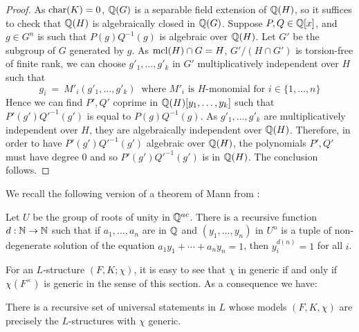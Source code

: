\begin{proof}
As $\mathrm{char}(K)=0$, $\mathbb{Q}(G)$ is a separable field extension of $\mathbb{Q}(H)$, so it suffices to check that $\mathbb{Q}(H)$ is algebraically closed in $\mathbb{Q}(G)$. 
Suppose $P, Q \in \mathbb{Q}[x]$, and $g \in G^n$ is such that $P(g)Q^{-1}(g)$ is algebraic over $\mathbb{Q}(H)$. Let $G'$ be the subgroup of $G$ generated by $g$. 
As $\mathrm{mcl}(H) \cap G=H $, $G'\slash (H \cap G')$ is torsion-free of finite rank, we can choose $g'_1, \ldots, g'_k$ in $G'$ multiplicatively independent over $H$ such that $$g_i\ =\ M'_i(g'_1, \ldots, g'_k)\ \text{ where }  M'_i \text{ is } H\text{-monomial for }i \in \{1, \ldots, n\}$$
Hence we can find  $P', Q'$ coprime in $\mathbb{Q}(H)[y_1, \ldots, y_k]$ such that $P'(g')Q'^{-1}(g')$ is equal to  $P(g)Q^{-1}(g)$.
As $g'_1, \ldots, g'_k$ are multiplicatively independent over $H$, they are algebraically independent over $\mathbb{Q}(H)$. 
Therefore, in order to have $P'(g')Q'^{-1}(g')$ algebraic over $\mathbb{Q}(H)$, the polynomials $P', Q'$ must have degree $0$ and  so $P'(g')Q'^{-1}(g')$ is in $\mathbb{Q}(H)$. The conclusion follows.
\end{proof}

\noindent We recall the following version of a theorem of Mann from \cite{Mann}:

\begin{thm*}[Mann] 
Let $U$ be the group of roots of unity in $\mathbb{Q}^{ac}$. There is a recursive function \( d: \mathbb{N} \to \mathbb{N} \) such that if \(a_1, \ldots, a_n\) are in \( \mathbb{Q}\)  and \((y_1, \ldots, y_n)\) in \(U^n\) is a tuple of non-degenerate solution of the equation $a_1y_1+\cdots+a_ny_n=1$, then \( y_i^{d(n)}=1 \) for all \(i\).
\end{thm*}

\noindent
For an $L$-structure $(F, K; \chi)$, it is easy to see that $\chi$ in generic if and only if $\chi(F^\times)$ is generic  in the sense of this section. As a consequence we have:

\begin{prop} \label{GenericAxiom}
There is a recursive set of universal statements in $L$ whose models $(F, K, \chi)$ are precisely the $L$-structures with $\chi$ generic.
\end{prop}

